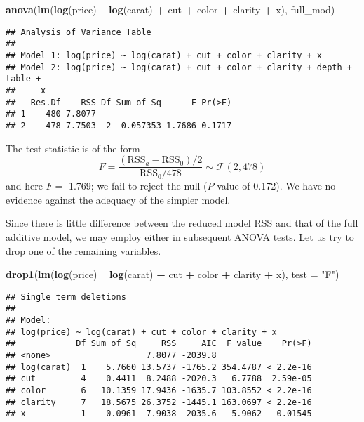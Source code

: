 \documentclass[]{book}
\newenvironment{Shaded}{\begin{snugshade}}{\end{snugshade}}
\newcommand{\DataTypeTok}[1]{\textcolor[rgb]{0.13,0.29,0.53}{#1}}
\newcommand{\KeywordTok}[1]{\textcolor[rgb]{0.13,0.29,0.53}{\textbf{#1}}}
\newcommand{\NormalTok}[1]{#1}
\newcommand{\OperatorTok}[1]{\textcolor[rgb]{0.81,0.36,0.00}{\textbf{#1}}}
\newcommand{\StringTok}[1]{\textcolor[rgb]{0.31,0.60,0.02}{#1}}
\theoremstyle{definition}
\theoremstyle{definition}
\theoremstyle{definition}
\theoremstyle{remark}
\begin{document}
\begin{Shaded}
\begin{Highlighting}[]
\KeywordTok{anova}\NormalTok{(}\KeywordTok{lm}\NormalTok{(}\KeywordTok{log}\NormalTok{(price) }\OperatorTok{~}\StringTok{ }\KeywordTok{log}\NormalTok{(carat) }\OperatorTok{+}\StringTok{ }\NormalTok{cut }\OperatorTok{+}\StringTok{ }\NormalTok{color }\OperatorTok{+}\StringTok{ }\NormalTok{clarity }\OperatorTok{+}\StringTok{ }\NormalTok{x), full_mod)}
\end{Highlighting}
\end{Shaded}

\begin{verbatim}
## Analysis of Variance Table
## 
## Model 1: log(price) ~ log(carat) + cut + color + clarity + x
## Model 2: log(price) ~ log(carat) + cut + color + clarity + depth + table + 
##     x
##   Res.Df    RSS Df Sum of Sq      F Pr(>F)
## 1    480 7.8077                           
## 2    478 7.7503  2  0.057353 1.7686 0.1717
\end{verbatim}

The test statistic is of the form
\[F = \frac{(\mathrm{RSS}_a-\mathrm{RSS}_0)/2}{\mathrm{RSS}_0/478}\sim \mathcal{F}(2, 478)\]
and here \(F=\) 1.769; we fail to reject the null (\(P\)-value of
0.172). We have no evidence against the adequacy of the simpler model.

Since there is little difference between the reduced model RSS and that
of the full additive model, we may employ either in subsequent ANOVA
tests. Let us try to drop one of the remaining variables.

\begin{Shaded}
\begin{Highlighting}[]
\KeywordTok{drop1}\NormalTok{(}\KeywordTok{lm}\NormalTok{(}\KeywordTok{log}\NormalTok{(price) }\OperatorTok{~}\StringTok{ }\KeywordTok{log}\NormalTok{(carat) }\OperatorTok{+}\StringTok{ }\NormalTok{cut }\OperatorTok{+}\StringTok{ }\NormalTok{color }\OperatorTok{+}\StringTok{ }\NormalTok{clarity }\OperatorTok{+}\StringTok{ }\NormalTok{x), }\DataTypeTok{test =} \StringTok{"F"}\NormalTok{)}
\end{Highlighting}
\end{Shaded}

\begin{verbatim}
## Single term deletions
## 
## Model:
## log(price) ~ log(carat) + cut + color + clarity + x
##            Df Sum of Sq     RSS     AIC  F value    Pr(>F)
## <none>                   7.8077 -2039.8                   
## log(carat)  1    5.7660 13.5737 -1765.2 354.4787 < 2.2e-16
## cut         4    0.4411  8.2488 -2020.3   6.7788  2.59e-05
## color       6   10.1359 17.9436 -1635.7 103.8552 < 2.2e-16
## clarity     7   18.5675 26.3752 -1445.1 163.0697 < 2.2e-16
## x           1    0.0961  7.9038 -2035.6   5.9062   0.01545
\end{verbatim}
\end{document}
